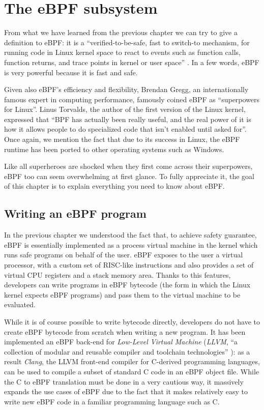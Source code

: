 \chapter{The eBPF subsystem}

From what we have learned from the previous chapter we can try to give a definition to eBPF: it is a ``verified-to-be-safe, fast to switch-to mechanism, for running code in Linux kernel space to react to events such as function calls, function returns, and trace points in kernel or user space'' \cite{eBPFLinuxJournal}.
In a few words, eBPF is very powerful because it is fast and safe. 

Given also eBPF's efficiency and flexibility, Brendan Gregg, an internationally famous expert in computing performance,  famously coined eBPF as ``superpowers for Linux''.
Linus Torvalds, the author of the first version of the Linux kernel, expressed that ``BPF has actually been really useful, and the real power of it is how it allows people to do specialized code that isn't enabled until asked for''.
Once again, we mention the fact that due to its success in Linux, the eBPF runtime has been ported to other operating systems such as Windows.

Like all superheroes are shocked when they first come across their superpowers, eBPF too can seem overwhelming at first glance.
To fully appreciate it, the goal of this chapter is to explain everything you need to know about eBPF.

\section{Writing an eBPF program}

In the previous chapter we understood the fact that, to achieve safety guarantee, eBPF is essentially implemented as a process virtual machine in the kernel which runs safe programs on behalf of the user.
eBPF exposes to the user a virtual processor, with a custom set of RISC-like instructions and also provides a set of virtual CPU registers and a stack memory area.
Thanks to this features, developers can write programs in eBPF bytecode (the form in which the Linux kernel expects eBPF programs) and pass them to the virtual machine to be evaluated.

While it is of course possible to write bytecode directly, developers do not have to create eBPF bytecode from scratch when writing a new program.
It has been implemented an eBPF back-end for \textit{Low-Level Virtual Machine} (\textit{LLVM}, ``a collection of modular and reusable compiler and toolchain technologies'' \cite{LLVMWebsite}): as a result \textit{Clang}, the LLVM front-end compiler for C-derived programming languages, can be used to compile a subset of standard C code in an eBPF object file.
While the C to eBPF translation must be done in a very cautious way, it massively expands the use cases of eBPF due to the fact that it makes relatively easy to write new eBPF code in a familiar programming language such as C.

